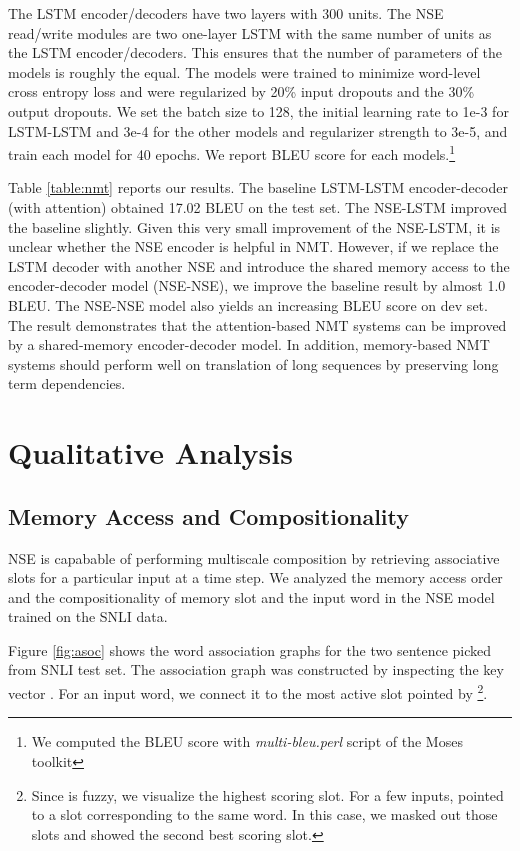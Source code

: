 \documentclass{article}
\begin{document}
The LSTM encoder/decoders have two layers with 300 units. The NSE read/write modules are two one-layer LSTM with the same number of units as the LSTM encoder/decoders. This ensures that the number of parameters of the models is roughly the equal. The models were trained to minimize word-level cross entropy loss and were regularized by 20\% input dropouts and the 30\% output dropouts. We set the batch size to 128, the initial learning rate to 1e-3 for LSTM-LSTM and 3e-4 for the other models and  regularizer strength to 3e-5, and train each model for 40 epochs. We report BLEU score for each models.\footnote{We computed the BLEU score with \textit{multi-bleu.perl} script of the Moses toolkit}

Table \ref{table:nmt} reports our results. The baseline LSTM-LSTM encoder-decoder (with attention) obtained 17.02 BLEU on the test set. The NSE-LSTM improved the baseline slightly. Given this very small improvement of the NSE-LSTM, it is unclear whether the NSE encoder is helpful in NMT. However, if we replace the LSTM decoder with another NSE and introduce the shared memory access to the encoder-decoder model (NSE-NSE), we improve the baseline result by almost 1.0 BLEU. The NSE-NSE model also yields an increasing BLEU score on dev set. 
The result demonstrates that the attention-based NMT systems can be improved by a shared-memory encoder-decoder model. In addition, memory-based NMT systems should perform well on translation of long sequences by preserving long term dependencies.

\section{Qualitative Analysis}
\subsection{Memory Access and Compositionality}
NSE is capabable of performing multiscale composition by retrieving associative slots for a particular input at a time step. We analyzed the memory access order and the compositionality of memory slot and the input word in the NSE model trained on the SNLI data.

Figure \ref{fig:asoc} shows the word association graphs for the two sentence picked from SNLI test set. The association graph was constructed by inspecting the key vector . For an input word, we connect it to the most active slot pointed by \footnote{Since  is fuzzy, we visualize the highest scoring slot. For a few inputs,  pointed to a slot corresponding to the same word. In this case, we masked out those slots and showed the second best scoring slot.}. 
\end{document}
